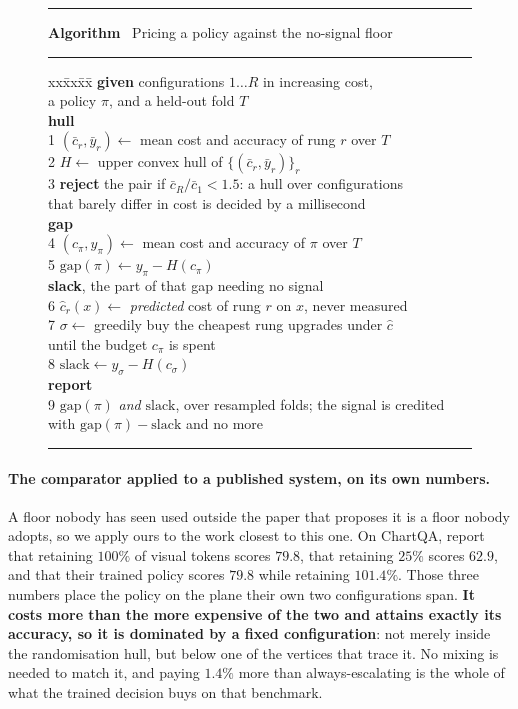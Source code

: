 \documentclass[10pt,twocolumn]{article}
\theoremstyle{plain}
\newcounter{algorithm}
\renewcommand{\thealgorithm}{\arabic{algorithm}}
\newenvironment{algorithm}[1][t]%
  {\begin{figure}[#1]\small\hrule\vspace{2pt}}%
  {\vspace{-4pt}\hrule\end{figure}}
\newcommand{\algcaption}[1]{%
  \refstepcounter{algorithm}%
  \textbf{Algorithm \thealgorithm}\ #1\vspace{1pt}\hrule\vspace{3pt}}
\begin{document}
\begin{algorithm}[t]
\algcaption{Pricing a policy against the no-signal floor}\label{alg:hull}
\begin{tabbing}
xx\=xx\=xx\=\kill
\textbf{given} configurations $1 \dots R$ in increasing cost, \\
\> a policy $\pi$, and a held-out fold $T$ \\
\textbf{hull} \\
1\> $(\bar c_r, \bar y_r) \leftarrow$ mean cost and accuracy of rung $r$ over $T$ \\
2\> $H \leftarrow$ upper convex hull of $\{(\bar c_r, \bar y_r)\}_r$ \\
3\> \textbf{reject} the pair if $\bar c_R / \bar c_1 < 1.5$: a hull over
configurations \\
\> that barely differ in cost is decided by a millisecond \\
\textbf{gap} \\
4\> $(c_\pi, y_\pi) \leftarrow$ mean cost and accuracy of $\pi$ over $T$ \\
5\> $\mathrm{gap}(\pi) \leftarrow y_\pi - H(c_\pi)$ \\
\textbf{slack}, the part of that gap needing no signal \\
6\> $\hat c_r(x) \leftarrow$ \emph{predicted} cost of rung $r$ on $x$, never measured \\
7\> $\sigma \leftarrow$ greedily buy the cheapest rung upgrades under $\hat c$ \\
\> until the budget $c_\pi$ is spent \\
8\> $\mathrm{slack} \leftarrow y_\sigma - H(c_\sigma)$ \\
\textbf{report} \\
9\> $\mathrm{gap}(\pi)$ \emph{and} $\mathrm{slack}$, over resampled folds; the
signal is credited \\
\> with $\mathrm{gap}(\pi) - \mathrm{slack}$ and no more
\end{tabbing}
\end{algorithm}

\paragraph{The comparator applied to a published system, on its own numbers.}
A floor nobody has seen used outside the paper that proposes it is a floor
nobody adopts, so we apply ours to the work closest to this one. On ChartQA,
\cite{visionthink} report that retaining $100\%$ of visual tokens scores
$79.8$, that retaining $25\%$ scores $62.9$, and that their trained policy
scores $79.8$ while retaining $101.4\%$. Those three numbers place the policy
on the plane their own two configurations span. \textbf{It costs more than the
more expensive of the two and attains exactly its accuracy, so it is dominated
by a fixed configuration}: not merely inside the randomisation hull, but below
one of the vertices that trace it. No mixing is needed to match it, and paying
$1.4\%$ more than always-escalating is the whole of what the trained decision
buys on that benchmark.
\end{document}

